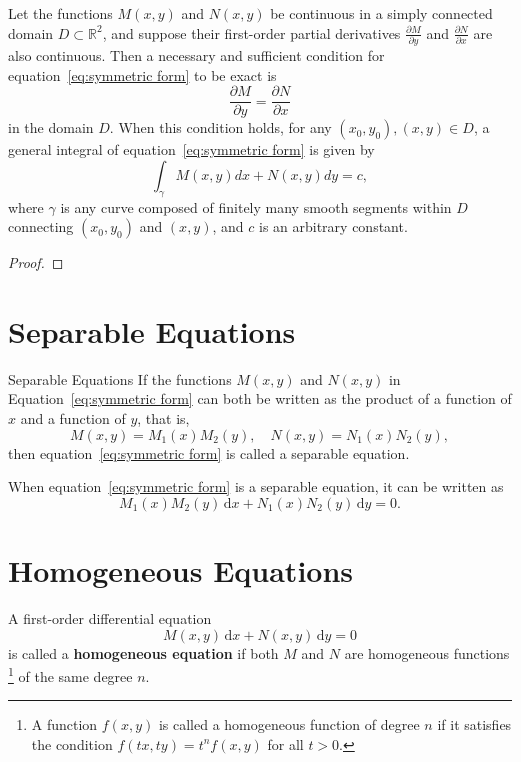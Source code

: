 \documentclass[11pt]{elegantbook}
\begin{document}
\begin{theorem}
    Let the functions \(M(x, y)\) and \(N(x, y)\) be continuous in a simply connected domain \(D \subset \mathbb{R}^2\), 
    and suppose their first-order partial derivatives \(\frac{\partial M}{\partial y}\) and \(\frac{\partial N}{\partial x}\) are also continuous. 
    Then a necessary and sufficient condition for equation~\eqref{eq:symmetric form} to be exact is
    \[
    \frac{\partial M}{\partial y} = \frac{\partial N}{\partial x}
    \]
    in the domain \(D\). 
    When this condition holds, for any \((x_0, y_0), (x, y) \in D\), a general integral of equation~\eqref{eq:symmetric form} is given by
    \[
    \int_{\gamma} M(x, y)dx + N(x, y)dy = c,
    \]
    where \(\gamma\) is any curve composed of finitely many smooth segments within \(D\) 
    connecting \((x_0, y_0)\) and \((x, y)\), and \(c\) is an arbitrary constant.
\end{theorem}
\begin{proof}
    
\end{proof}

\section{Separable Equations}
\begin{definition}{Separable Equations}
    If the functions \(M(x, y)\) and \(N(x, y)\) in Equation~\eqref{eq:symmetric form} can both be written as 
    the product of a function of \(x\) and a function of \(y\), that is,
    \[
    M(x, y) = M_1(x) M_2(y), \quad N(x, y) = N_1(x) N_2(y),
    \]
    then equation~\eqref{eq:symmetric form} is called a separable equation.

    When equation~\eqref{eq:symmetric form} is a separable equation, it can be written as
    \begin{equation}\label{eq:separable form}
        M_1(x) M_2(y) \, \mathrm{d}x + N_1(x) N_2(y) \, \mathrm{d}y = 0.  
    \end{equation}
\end{definition}

\section{Homogeneous Equations}
\begin{definition}\label{def:homogeneous equations}
    A first-order differential equation 
    \begin{equation*}
        M(x, y) \, \mathrm{d}x + N(x, y) \, \mathrm{d}y = 0
    \end{equation*}
    is called a \textbf{homogeneous equation} if both \(M\) and \(N\) are homogeneous functions
    \footnote{
        A function \(f(x, y)\) is called a homogeneous function of degree \(n\) 
        if it satisfies the condition \(f(tx, ty) = t^n f(x, y)\) for all \(t > 0\).
        }
    of the same degree \(n\).    
\end{definition}
\end{document}
